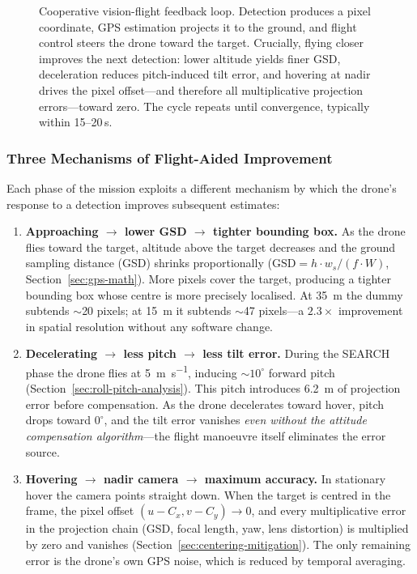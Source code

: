 \begin{figure}[H]
  \caption{Cooperative vision-flight feedback loop.  Detection produces a pixel coordinate, GPS estimation projects it to the ground, and flight control steers the drone toward the target.  Crucially, flying closer improves the next detection: lower altitude yields finer GSD, deceleration reduces pitch-induced tilt error, and hovering at nadir drives the pixel offset---and therefore all multiplicative projection errors---toward zero.  The cycle repeats until convergence, typically within 15--20\,s.}
  \label{fig:cooperative-loop}
\end{figure}

\subsubsection{Three Mechanisms of Flight-Aided Improvement}

Each phase of the mission exploits a different mechanism by which the drone's response to a detection improves subsequent estimates:

\begin{enumerate}
  \item \textbf{Approaching $\boldsymbol{\to}$ lower GSD $\boldsymbol{\to}$ tighter bounding box.}
    As the drone flies toward the target, altitude above the target decreases and the ground sampling distance (GSD) shrinks proportionally ($\mathrm{GSD} = h \cdot w_s / (f \cdot W)$, Section~\ref{sec:gps-math}).  More pixels cover the target, producing a tighter bounding box whose centre is more precisely localised.  At \SI{35}{\metre} the dummy subtends $\sim$20 pixels; at \SI{15}{\metre} it subtends $\sim$47 pixels---a $2.3\times$ improvement in spatial resolution without any software change.

  \item \textbf{Decelerating $\boldsymbol{\to}$ less pitch $\boldsymbol{\to}$ less tilt error.}
    During the SEARCH phase the drone flies at \SI{5}{\metre\per\second}, inducing $\sim$$10^{\circ}$ forward pitch (Section~\ref{sec:roll-pitch-analysis}).  This pitch introduces \SI{6.2}{\metre} of projection error before compensation.  As the drone decelerates toward hover, pitch drops toward $0^{\circ}$, and the tilt error vanishes \emph{even without the attitude compensation algorithm}---the flight manoeuvre itself eliminates the error source.

  \item \textbf{Hovering $\boldsymbol{\to}$ nadir camera $\boldsymbol{\to}$ maximum accuracy.}
    In stationary hover the camera points straight down.  When the target is centred in the frame, the pixel offset $(u - C_x, v - C_y) \to 0$, and every multiplicative error in the projection chain (GSD, focal length, yaw, lens distortion) is multiplied by zero and vanishes (Section~\ref{sec:centering-mitigation}).  The only remaining error is the drone's own GPS noise, which is reduced by temporal averaging.
\end{enumerate}

